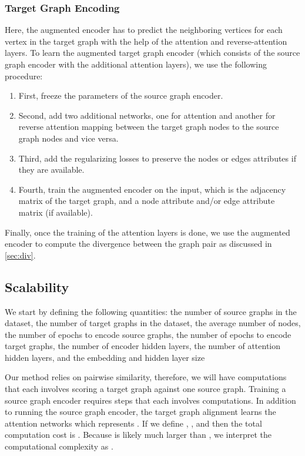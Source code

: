 \documentclass[sigconf]{acmart}
\begin{document}
\subsubsection{Target Graph Encoding}
Here, the augmented encoder has to predict the neighboring vertices for each vertex in the target graph with the help of the attention and reverse-attention layers.
To learn the augmented target graph encoder (which consists of the source graph encoder with the additional attention layers), we use the following procedure:
\begin{enumerate}
    \item First, freeze the parameters of the source graph encoder.
    \item Second, add two additional networks, one for attention and another for reverse attention mapping between the target graph nodes to the source graph nodes and vice versa.
    \item Third, add the regularizing losses to preserve the nodes or edges attributes if they are available.
    \item Fourth, train the augmented encoder on the input, which is the adjacency matrix of the target graph, and a node attribute and/or edge attribute matrix (if available).
\end{enumerate}
\noindent Finally, once the training of the attention layers is done, we use the augmented encoder to compute the divergence between the graph pair as discussed in \ref{sec:div}.

\subsection{Scalability}
\label{sec:scalability}
We start by defining the following quantities:
 the number of source graphs in the dataset,
 the number of target graphs in the dataset,
 the average number of nodes,
 the number of epochs to encode source graphs,
 the number of epochs to encode target graphs,
 the number of encoder hidden layers,
 the number of attention hidden layers, and
 the embedding and hidden layer size

Our method relies on pairwise similarity, therefore, we will have  computations that each involves scoring a target graph against one source graph.
Training a source graph encoder requires  steps that each involves  computations.
In addition to running the source graph encoder, the target graph alignment learns the attention networks which represents .
If we define , , and 
then the total computation cost is 
.
Because  is likely much larger than , we interpret the computational complexity as .
\end{document}
